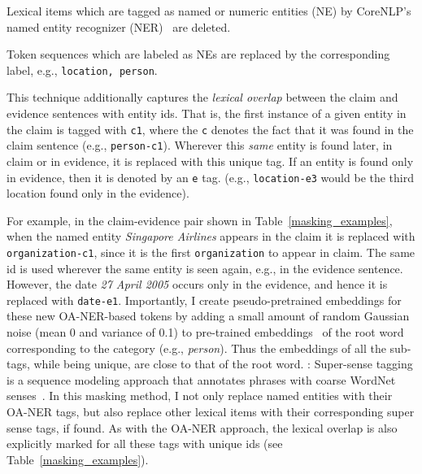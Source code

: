 \documentclass[compsoc,onecolumn]{IEEEtran}
\begin{document}
{}
Lexical items which are tagged as named or numeric entities (NE) by CoreNLP's named entity recognizer (NER)~\cite{manning2014stanford} are deleted.  

{}  Token sequences which are labeled as NEs are replaced by the corresponding label, e.g., \texttt{location, person}.

{} This technique additionally captures the \textit{lexical overlap} between the claim and evidence sentences with entity ids.  
That is, the first instance of a given entity in the claim is tagged with \texttt{c1}, where the \texttt{c} denotes the fact that it was found in the claim sentence (e.g., \texttt{person-c1}). Wherever this {\em same} entity is found later, in claim or in evidence, it is replaced with this unique tag. If an entity is found only in evidence, then it is denoted by an \texttt{e} tag. (e.g., \texttt{location-e3} would be the third location found only in the evidence).

For example, in the claim-evidence pair shown in Table~\ref{masking_examples}, when the named entity \textit{Singapore Airlines} appears in the claim it is replaced with \texttt{organization-c1}, since it is the first \texttt{organization} to appear in claim. 
The same id is used wherever the same entity is seen again, e.g., in the evidence sentence. However, the date \textit{27 April 2005} occurs only in the evidence, and hence it is replaced with \texttt{date-e1}.
Importantly, I create pseudo-pretrained embeddings for these new OA-NER-based tokens by adding a small amount of random Gaussian noise (mean 0 and variance of 0.1) to pre-trained embeddings~\cite{pennington2014glove} of the root word corresponding to the category (e.g., \textit{person}). Thus the embeddings of all the sub-tags, while being unique, are close to that of the root word.
{}:
Super-sense tagging is a sequence modeling approach that annotates phrases with coarse WordNet senses~\cite{ciaramita2003supersense,miller1990introduction}. In this masking method, I not only replace named entities with their OA-NER tags, but also replace other lexical items with their corresponding super sense tags, if found. As with the OA-NER approach, the lexical overlap is also explicitly marked for all these tags with unique ids (see Table~\ref{masking_examples}). 
\end{document}
